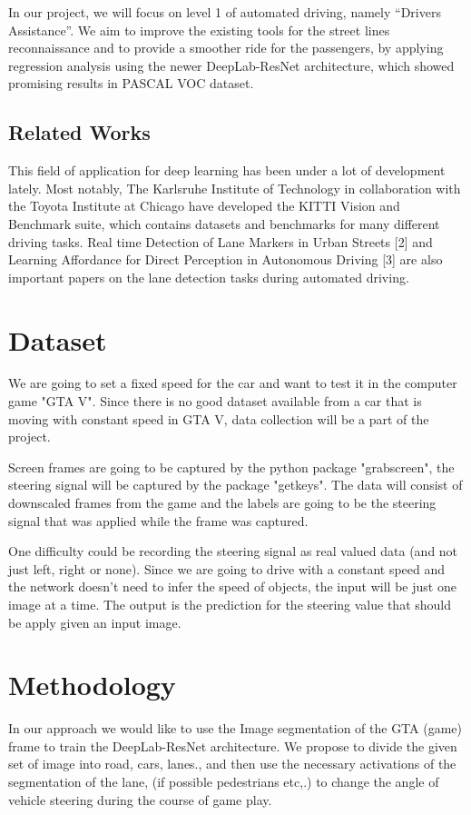 \documentclass[10pt,twocolumn,letterpaper]{article}
\begin{document}
	In our project, we will focus on level 1 of automated driving, namely “Drivers Assistance”. We aim to improve the existing tools for the street lines reconnaissance and to provide a smoother ride for the passengers, by applying regression analysis using the newer DeepLab-ResNet architecture, which showed promising results in PASCAL VOC dataset.
	
	\subsection{Related Works}
	
	This field of application for deep learning has been under a lot of development lately. Most notably, The Karlsruhe Institute of Technology in collaboration with the Toyota Institute at Chicago have developed the KITTI Vision and Benchmark suite, which contains datasets and benchmarks for many different driving tasks. Real time Detection of Lane Markers in Urban Streets [2] and Learning Affordance for Direct Perception in Autonomous Driving [3] are also important papers on the lane detection tasks during automated driving.
	
	\section{Dataset}
	We are going to set a fixed speed for the car and want to test it in the computer game "GTA V". Since there is no good dataset available from a car that is moving with constant speed in GTA V, data collection will be a part of the project.  
	
	Screen frames are going to be captured by the python package "grabscreen", the steering signal will be captured by the package "getkeys". The data will consist of downscaled frames from the game and the labels are going to be the steering signal that was applied while the frame was captured.
	
	One difficulty could be recording the steering signal as real valued data (and not just left, right or none). Since we are going to drive with a constant speed and the network doesn't need to infer the speed of objects, the input will be just one image at a time. The output is the prediction for the steering value that should be apply given an input image.
	
	\section{Methodology}
	In our approach we would like to use the Image segmentation of the GTA (game) frame to train the DeepLab-ResNet architecture. We propose to divide the given set of image into road, cars, lanes., and then use the 
	necessary activations of the segmentation of the lane, (if possible pedestrians etc,.) to change the angle of vehicle steering during the course of game play.
	
\end{document}
